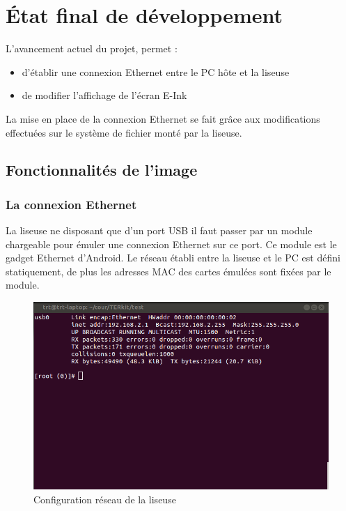 \chapter{État final de développement}

L'avancement actuel du projet, permet : 
\begin{itemize}
	\item d'établir une connexion Ethernet entre le PC hôte et la liseuse
	\item de modifier l'affichage de l'écran E-Ink
\end{itemize}

La mise en place de la connexion Ethernet se fait grâce aux modifications effectuées sur le système de fichier monté par la liseuse.

\section{Fonctionnalités de l'image} %

\subsection{La connexion Ethernet}
La liseuse ne disposant que d'un port USB il faut passer par un module chargeable pour émuler une connexion Ethernet sur ce port.
Ce module est le gadget Ethernet d'Android.
Le réseau établi entre la liseuse et le PC est défini statiquement, de plus les adresses MAC des cartes émulées sont fixées par le module.

\begin{figure}[]
	\begin{center}
	\includegraphics[scale=0.5]{capt_prs_ifconfig.png}	
	\end{center}
	\caption{Configuration réseau de la liseuse}
\end{figure}


